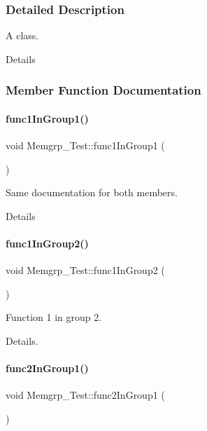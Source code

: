 \subsubsection{Detailed Description}
A class. 

Details 

\subsubsection{Member Function Documentation}
\hypertarget{class_memgrp___test_a5052066c03efb51395b5334da4255cd2}{}\label{class_memgrp___test_a5052066c03efb51395b5334da4255cd2} 
\paragraph{\texorpdfstring{func1\+In\+Group1()}{func1InGroup1()}}
{\footnotesize\ttfamily void Memgrp\+\_\+\+Test\+::func1\+In\+Group1 (\begin{DoxyParamCaption}{ }\end{DoxyParamCaption})}



Same documentation for both members. 

Details \hypertarget{class_memgrp___test_ab0e6553ddc36ac3cef0ac229c5dd4cdb}{}\label{class_memgrp___test_ab0e6553ddc36ac3cef0ac229c5dd4cdb} 
\paragraph{\texorpdfstring{func1\+In\+Group2()}{func1InGroup2()}}
{\footnotesize\ttfamily void Memgrp\+\_\+\+Test\+::func1\+In\+Group2 (\begin{DoxyParamCaption}{ }\end{DoxyParamCaption})}



Function 1 in group 2. 

Details. \hypertarget{class_memgrp___test_a8296fa2c355e84ecf25522d54807548c}{}\label{class_memgrp___test_a8296fa2c355e84ecf25522d54807548c} 
\paragraph{\texorpdfstring{func2\+In\+Group1()}{func2InGroup1()}}
{\footnotesize\ttfamily void Memgrp\+\_\+\+Test\+::func2\+In\+Group1 (\begin{DoxyParamCaption}{ }\end{DoxyParamCaption})}



